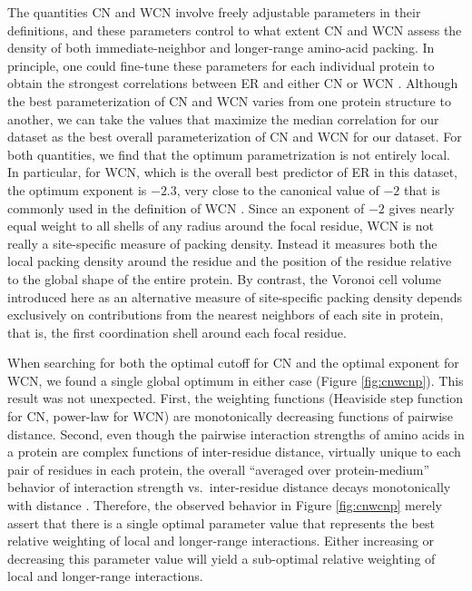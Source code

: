 \documentclass[12pt]{article}
\begin{document}
   The quantities CN and WCN involve freely adjustable parameters in their definitions, and these parameters control to what extent CN and WCN assess the density of both immediate-neighbor and longer-range amino-acid packing. In principle, one could fine-tune these parameters for each individual protein to obtain the strongest correlations between ER and either CN or WCN \cite{yeh_local_2014}. Although the best parameterization of CN and WCN varies from one protein structure to another, we can take the values that maximize the median correlation for our dataset as the best overall parameterization of CN and WCN for our dataset. For both quantities, we find that the optimum parametrization is not entirely local. In particular, for WCN, which is the overall best predictor of ER in this dataset, the optimum exponent is $-2.3$, very close to the canonical value of $-2$ that is commonly used in the definition of WCN  \cite{lin_deriving_2008, yang_protein_2009, huang_mechanistic_2014, yeh_site-specific_2014, yeh_local_2014, marcos_too_2015}. Since an exponent of $-2$ gives nearly equal weight to all shells of any radius around the focal residue, WCN is not really a site-specific measure of packing density. Instead it measures both the local packing density around the residue and the position of the residue relative to the global shape of the entire protein. By contrast, the Voronoi cell volume introduced here as an alternative measure of site-specific packing density depends exclusively on contributions from the nearest neighbors of each site in protein, that is, the first coordination shell around each focal residue.
   
When searching for both the optimal cutoff for CN and the optimal exponent for WCN, we found a single global optimum in either case (Figure \ref{fig:cnwcnp}). This result was not unexpected. First, the weighting functions (Heaviside step function for CN, power-law for WCN) are monotonically decreasing functions of pairwise distance. Second, even though the pairwise interaction strengths of amino acids in a protein are complex functions of inter-residue distance, virtually unique to each pair of residues in each protein, the overall ``averaged over protein-medium'' behavior of interaction strength vs.\ inter-residue distance decays monotonically with distance \cite{dehouck_effective_2013,xia_correlation_2015,xia_multiscale_2015}. Therefore, the observed behavior in Figure \ref{fig:cnwcnp} merely assert that there is a single optimal parameter value that represents the best relative weighting of local and longer-range interactions. Either increasing or decreasing this parameter value will yield a sub-optimal relative weighting of local and longer-range interactions.
\end{document}

